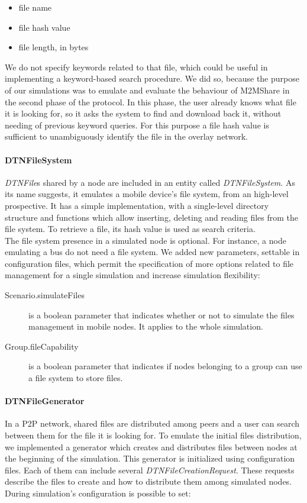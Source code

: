 \begin{itemize}
\item file name
\item file hash value
\item file length, in bytes
\end{itemize}

We do not specify keywords related to that file, which could be useful in implementing a keyword-based search procedure. We did so, because the purpose of our simulations was to emulate and evaluate the behaviour of M2MShare in the second phase of the protocol. In this phase, the user already knows what file it is looking for, so it asks the system to find and download back it, without needing of previous keyword queries. For this purpose a file hash value is sufficient to unambiguously identify the file in the overlay network.


\paragraph{DTNFileSystem}
\textit{DTNFile}s shared by a node are included in an entity called \textit{DTNFileSystem}. As its name suggests, it emulates a mobile device's file system, from an high-level prospective. It has a simple implementation, with a single-level directory structure and functions which allow inserting, deleting and reading files from the file system. To retrieve a file, its hash value is used as search criteria.
\\

The file system presence in a simulated node is optional. For instance, a node emulating a bus do not need a file system. We added new parameters, settable in configuration files, which permit the specification of more options related to file management for a single simulation and increase simulation flexibility: 

\begin{description}
\item[Scenario.simulateFiles] is a boolean parameter that indicates whether or not to simulate the files management in mobile nodes. It applies to the whole simulation.
\item[Group.fileCapability] is a boolean parameter that indicates if nodes belonging to a group can use a file system to store files.
\end{description}

\paragraph{DTNFileGenerator}
\label{fileGeneratorImplementazione}
In a P2P network, shared files are distributed among peers and a user can search between them for the file it is looking for. To emulate the initial files distribution, we implemented a generator which creates and distributes files between nodes at the beginning of the simulation. This generator is initialized using configuration files. Each of them can include several \textit{DTNFileCreationRequest}. These requests describe the files to create and how to distribute them among simulated nodes. During simulation's configuration is possible to set:

